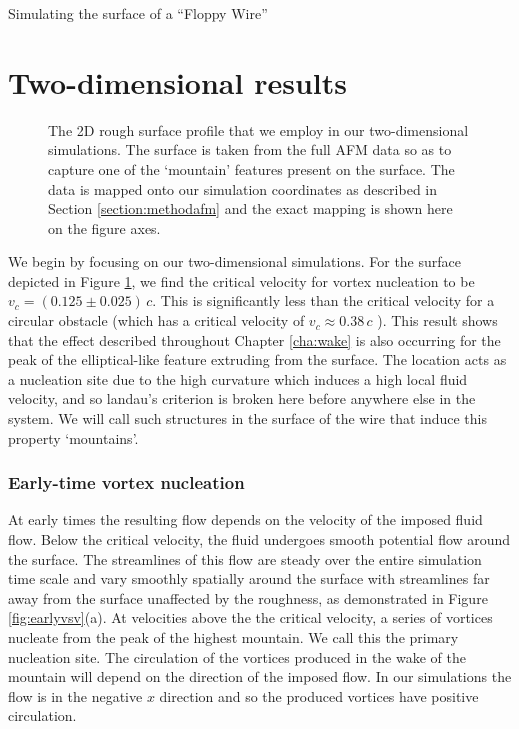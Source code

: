 \begin{chapter}{\label{cha:afm}Simulating the surface of a ``Floppy Wire''}
\section{Two-dimensional results}
\begin{figure}
  \centering
  \caption{\label{fig:surfprofile} The 2D rough surface profile that we employ in our two-dimensional simulations. The surface is taken from the full AFM data so as to capture one of the `mountain' features present on the surface. The data is mapped onto our simulation coordinates as described in Section \ref{section:methodafm} and the exact mapping is shown here on the figure axes.}
\end{figure}

We begin by focusing on our two-dimensional simulations. For the surface depicted in Figure \ref{fig:surfprofile}, we find the critical velocity for vortex nucleation to be $v_c=(0.125\pm0.025)\,c$. This is significantly less than the critical velocity for a circular obstacle (which has a critical velocity of $v_c\approx 0.38\,c$ \cite{frisch92,nore93,win00,huepe00}). This result shows that the effect described throughout Chapter \ref{cha:wake} is also occurring for the peak of the elliptical-like feature extruding from the surface. The location acts as a nucleation site due to the high curvature which induces a high local fluid velocity, and so landau's criterion is broken here before anywhere else in the system. We will call such structures in the surface of the wire that induce this property `mountains'.

\subsubsection{Early-time vortex nucleation}
At early times the resulting flow depends on the velocity of the imposed fluid flow. Below the critical velocity, the fluid undergoes smooth potential flow around the surface. The streamlines of this flow are steady over the entire simulation time scale and vary smoothly spatially around the surface with streamlines far away from the surface unaffected by the roughness, as demonstrated in Figure \ref{fig:earlyvsv}(a). At velocities above the the critical velocity, a series of vortices nucleate from the peak of the highest mountain. We call this the primary nucleation site. The circulation of the vortices produced in the wake of the mountain will depend on the direction of the imposed flow. In our simulations the flow is in the negative $x$ direction and so the produced vortices have positive circulation.


\end{chapter}
